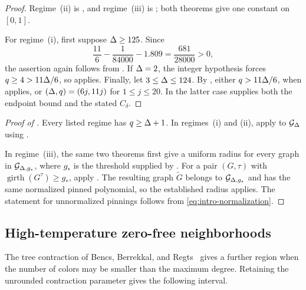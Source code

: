 \begin{proof}
Regime~\textup{(ii)} is , and regime~\textup{(iii)} is
; both theorems give one constant on
\([0,1]\).

For regime~\textup{(i)}, first suppose \(\Delta\ge125\).  Since
\[
  \frac{11}{6}-\frac1{84000}-1.809=\frac{681}{28000}>0,
\]
the assertion again follows from .  If \(\Delta=2\), the
integer hypothesis forces \(q\ge4>11\Delta/6\), so
 applies.  Finally, let \(3\le\Delta\le124\).
By , either \(q>11\Delta/6\), when
 applies, or \((\Delta,q)=(6j,11j)\) for
\(1\le j\le20\).  In the latter case
 supplies both the endpoint bound and the
stated \(C_\delta\).
\end{proof}

\begin{proof}[Proof of ]
Every listed regime has \(q\ge\Delta+1\).  In regimes~\textup{(i)} and
\textup{(ii)}, apply  to \(\mathcal{G}_{\Delta}\) using
.

In regime~\textup{(iii)}, the same two theorems first give a uniform radius
for every graph in \(\mathcal{G}_{\Delta,g_*}\), where \(g_*\) is the threshold supplied
by .  For a pair \((G,\tau)\) with
\(\operatorname{girth}(G^\tau)\ge g_*\), apply
.  The resulting graph
\(\widetilde G\) belongs to \(\mathcal{G}_{\Delta,g_*}\) and has the same normalized
pinned polynomial, so the established radius applies.  The statement for
unnormalized pinnings follows from \eqref{eq:intro-normalization}.
\end{proof}

\subsection{High-temperature zero-free neighborhoods}

The tree contraction of Bencs, Berrekkal, and
Regts~\cite{BencsBerrekkalRegts2025Trees} gives a further region when the
number of colors may be smaller than the maximum degree.  Retaining the
unrounded contraction parameter gives the following interval.

